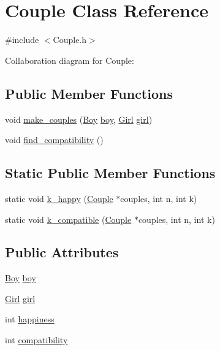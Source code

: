\hypertarget{class_couple}{}\section{Couple Class Reference}
\label{class_couple}


{\ttfamily \#include $<$Couple.\+h$>$}



Collaboration diagram for Couple\+:
\subsection*{Public Member Functions}
\begin{DoxyCompactItemize}
\item 
void \hyperlink{class_couple_a1ea5a69da1af9ff8b7a663be1d8ae05c}{make\+\_\+couples} (\hyperlink{class_boy}{Boy} \hyperlink{class_couple_a2f4c4e8df15d0a648023a29d48a4dbc8}{boy}, \hyperlink{class_girl}{Girl} \hyperlink{class_couple_a0e654a04711c8a9e1f53472c9e57cb5a}{girl})
\item 
void \hyperlink{class_couple_afd44c116312fd411df285bde11e24b94}{find\+\_\+compatibility} ()
\end{DoxyCompactItemize}
\subsection*{Static Public Member Functions}
\begin{DoxyCompactItemize}
\item 
static void \hyperlink{class_couple_a60b6b151595d937d91d7cf9471996a9a}{k\+\_\+happy} (\hyperlink{class_couple}{Couple} $\ast$couples, int n, int k)
\item 
static void \hyperlink{class_couple_ae93d0b2f169c7e21a3822bbf60fe0f14}{k\+\_\+compatible} (\hyperlink{class_couple}{Couple} $\ast$couples, int n, int k)
\end{DoxyCompactItemize}
\subsection*{Public Attributes}
\begin{DoxyCompactItemize}
\item 
\hyperlink{class_boy}{Boy} \hyperlink{class_couple_a2f4c4e8df15d0a648023a29d48a4dbc8}{boy}
\item 
\hyperlink{class_girl}{Girl} \hyperlink{class_couple_a0e654a04711c8a9e1f53472c9e57cb5a}{girl}
\item 
int \hyperlink{class_couple_aee78d616688f0cccff84e1c23cb31f7a}{happiness}
\item 
int \hyperlink{class_couple_af47d6ced781259303e10836182abb8c1}{compatibility}
\end{DoxyCompactItemize}


